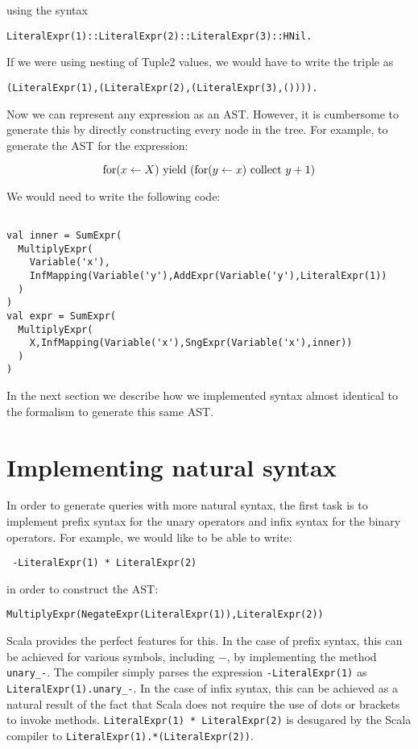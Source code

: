 using the syntax
\begin{lstlisting}
LiteralExpr(1)::LiteralExpr(2)::LiteralExpr(3)::HNil.
\end{lstlisting}

If we were using nesting of Tuple2 values, we would have to write the triple as

\begin{lstlisting}
(LiteralExpr(1),(LiteralExpr(2),(LiteralExpr(3),()))).
\end{lstlisting}

Now we can represent any expression as an AST. However, it is cumbersome to generate this by directly constructing every node in the tree. For example, to generate the AST for the expression: 

\begin{equation*}
\textrm{for}(x \leftarrow X) \textrm{ yield } (\textrm{for}(y \leftarrow x) \textrm{ collect } y+1)
\end{equation*}

We would need to write the following code:

\begin{lstlisting}

val inner = SumExpr(
  MultiplyExpr(
    Variable('x'),
    InfMapping(Variable('y'),AddExpr(Variable('y'),LiteralExpr(1))
  )
)
val expr = SumExpr(
  MultiplyExpr(
    X,InfMapping(Variable('x'),SngExpr(Variable('x'),inner))
  )
)
\end{lstlisting} \vspace{1em}

In the next section we describe how we implemented syntax almost identical to the formalism to generate this same AST.

\section{Implementing natural syntax}

In order to generate queries with more natural syntax, the first task is to implement prefix syntax for the unary operators and infix syntax for the binary operators. For example, we would like to be able to write:
\vs
\begin{lstlisting}
 -LiteralExpr(1) * LiteralExpr(2)
\end{lstlisting}
\vs
in order to construct the AST:
\vs
\begin{lstlisting}
MultiplyExpr(NegateExpr(LiteralExpr(1)),LiteralExpr(2))
\end{lstlisting}
\vs

Scala provides the perfect features for this. In the case of prefix syntax, this can be achieved for various symbols, including $-$, by implementing the method \lstinline{unary_-}. The compiler simply parses the expression \lstinline{-LiteralExpr(1)} as \lstinline{LiteralExpr(1).unary_-}. In the case of infix syntax, this can be achieved as a natural result of the fact that Scala does not require the use of dots or brackets to invoke methods.  \lstinline{LiteralExpr(1) * LiteralExpr(2)} is desugared by the Scala compiler to \lstinline{LiteralExpr(1).*(LiteralExpr(2))}.

